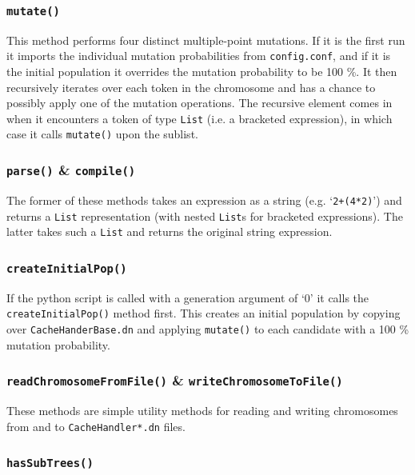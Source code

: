 \documentclass[compsoc,12pt,a4paper]{IEEEtran}
\begin{document}
			\subsubsection{\lstinline|mutate()|}
			
				This method performs four distinct multiple-point mutations. If it is the first run it imports the individual mutation probabilities from \lstinline|config.conf|, and if it is the initial population it overrides the mutation probability to be 100 \%. It then recursively iterates over each token in the chromosome and has a chance to possibly apply one of the mutation operations. The recursive element comes in when it encounters a token of type \lstinline|List| (i.e. a bracketed expression), in which case it calls \lstinline|mutate()| upon the sublist.
			
			\subsubsection{\lstinline|parse()| \& \lstinline|compile()|}
			
				The former of these methods takes an expression as a string (e.g. `\lstinline|2+(4*2)|') and returns a \lstinline|List| representation (with nested \lstinline|List|s for bracketed expressions). The latter takes such a \lstinline|List| and returns the original string expression.
				
			\subsubsection{\lstinline|createInitialPop()|}
			
				If the python script is called with a generation argument of `0' it calls the \lstinline[language=python]|createInitialPop()| method first. This creates an initial population by copying over \lstinline|CacheHanderBase.dn| and applying \lstinline[language=python]|mutate()| to each candidate with a 100 \% mutation probability.
			
			\subsubsection{\lstinline|readChromosomeFromFile()| \& \lstinline|writeChromosomeToFile()|}
			
				These methods are simple utility methods for reading and writing chromosomes from and to \lstinline|CacheHandler*.dn| files.
			
			\subsubsection{\lstinline|hasSubTrees()|}
			
\end{document}
